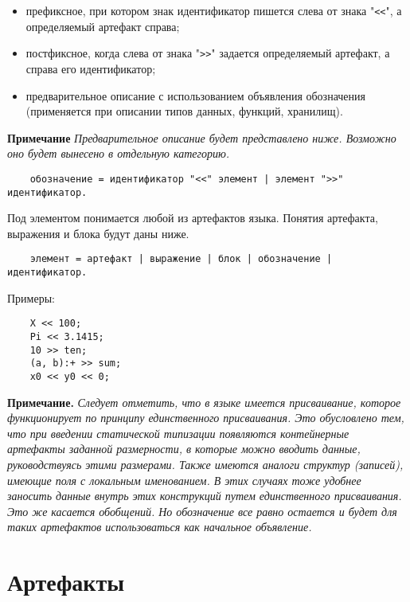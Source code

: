 {\begin{itemize}
	\item префиксное, при котором знак идентификатор пишется слева от знака "\verb|<<|", а определяемый артефакт справа;
	\item постфиксное, когда слева от знака "\verb|>>|" задается определяемый артефакт, а справа его идентификатор;
    \item предварительное описание с использованием объявления обозначения (применяется при описании типов данных, функций, хранилищ).
\end{itemize}

\textbf{Примечание}
\textit{Предварительное описание будет представлено ниже. Возможно оно будет вынесено в отдельную категорию.}

\begin{verbatim}
    обозначение = идентификатор "<<" элемент | элемент ">>" идентификатор.
\end{verbatim}

Под элементом понимается любой из артефактов языка. Понятия артефакта, выражения и блока будут даны ниже.

\begin{verbatim}
    элемент = артефакт | выражение | блок | обозначение | идентификатор.
\end{verbatim}

Примеры:

\begin{verbatim}
    X << 100;
    Pi << 3.1415;
    10 >> ten;
    (a, b):+ >> sum;
    x0 << y0 << 0;
\end{verbatim}

\textbf{Примечание.}
\textit{Следует отметить, что в языке имеется присваивание, которое функционирует по принципу единственного присваивания. Это обусловлено тем, что при введении статической типизации появляются контейнерные артефакты заданной размерности, в которые можно вводить данные, руководствуясь этими размерами. Также имеются аналоги структур (записей), имеющие поля с локальным именованием. В этих случаях тоже удобнее заносить данные внутрь этих конструкций путем единственного присваивания. Это же касается обобщений. Но обозначение все равно остается и будет для таких артефактов использоваться как начальное объявление.}

\section{Артефакты}
\label{smile:artefact}

}
